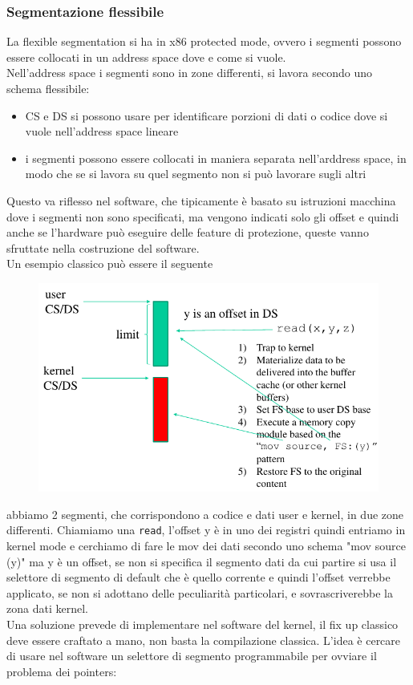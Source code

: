 \documentclass[12pt, oneside]{extbook}
\begin{document}
\subsubsection{Segmentazione flessibile}
La flexible segmentation si ha in x86 protected mode, ovvero i segmenti possono essere collocati in un address space dove e come si vuole.\\Nell'address space i segmenti sono in zone differenti, si lavora secondo uno schema flessibile:
\begin{itemize}
\item CS e DS si possono usare per identificare porzioni di dati o codice dove si vuole nell'address space lineare
\item i segmenti possono essere collocati in maniera separata nell'arddress space, in modo che se si lavora su quel segmento non si può lavorare sugli altri
\end{itemize} 
Questo va riflesso nel software, che tipicamente è basato su istruzioni macchina dove i segmenti non sono specificati, ma vengono indicati solo gli offset e quindi anche se l'hardware può eseguire delle feature di protezione, queste vanno sfruttate nella costruzione del software.\\Un esempio classico può essere il seguente
\begin{figure}[!h]
	\includegraphics[scale=0.4]{immagini/seg_prob_1.png}
\end{figure}
abbiamo 2 segmenti, che corrispondono a codice e dati user e kernel, in due zone differenti. Chiamiamo una \texttt{read}, l'offset y è in uno dei registri quindi entriamo in kernel mode e cerchiamo di fare le mov dei dati secondo uno schema "mov source (y)" ma y è un offset, se non si specifica il segmento dati da cui partire si usa il selettore di segmento di default che è quello corrente e quindi l'offset verrebbe applicato, se non si adottano delle peculiarità particolari, e sovrascriverebbe la zona dati kernel.\\Una soluzione prevede di implementare nel software del kernel, il fix up classico deve essere craftato a mano, non basta la compilazione classica. L'idea è cercare di usare nel software un selettore di segmento programmabile per ovviare il problema dei pointers:
\end{document}
